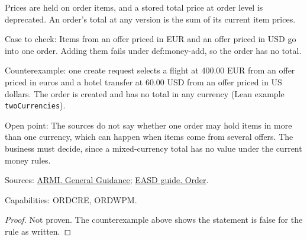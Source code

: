 \begin{theorem}
  \label{thm:order-creation-order-total-derived}
  Prices are held on order items, and a stored total price at order level is
  deprecated. An order's total at any version is the sum of its current item
  prices.

  Case to check: Items from an offer priced in EUR and an offer priced in
  USD go into one order. Adding them fails under def:money-add, so the order
  has no total.

  Counterexample: one create request selects a flight at 400.00 EUR from an
  offer priced in euros and a hotel transfer at 60.00 USD from an offer priced
  in US dollars.  The order is created and has no total in any currency (Lean
  example \texttt{twoCurrencies}).

  Open point: The sources do not say whether one order may hold items in
  more than one currency, which can happen when items come from several
  offers. The business must decide, since a mixed-currency total has no
  value under the current money rules.

  Sources: \href{https://standards.atlassian.net/wiki/spaces/ARMI/pages/584318980/General+Guidance}{ARMI, General Guidance};
  \href{https://standards.atlassian.net/wiki/spaces/EASD/pages/574849062/Order}{EASD guide, Order}.

  Capabilities: ORDCRE, ORDWPM.
\end{theorem}
\begin{proof}
  Not proven.  The counterexample above shows the statement is false for the
  rule as written.
\end{proof}

